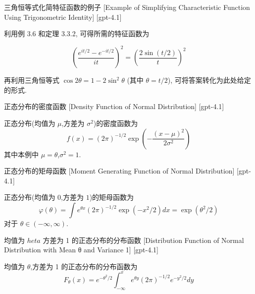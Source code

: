 \documentclass[UTF8]{ctexart}
\begin{document}
    
    
    \begin{xmp}
        {三角恒等式化简特征函数的例子}
        [Example of Simplifying Characteristic Function Using Trigonometric Identity]
        [gpt-4.1]
        
利用例 3.6 和定理 3.3.2, 可得所需的特征函数为

\[
\left( \frac{e^{i t / 2} - e^{-i t / 2}}{i t} \right)^{2} = \left( \frac{2 \sin (t / 2)}{t} \right)^{2}
\]

再利用三角恒等式 $\cos 2 \theta = 1 - 2 \sin^{2} \theta$ (其中 $\theta = t / 2$), 可将答案转化为此处给定的形式.

    \end{xmp}
    
    
    
    \begin{dfn}
        {正态分布的密度函数}
        [Density Function of Normal Distribution]
        [gpt-4.1]
        
正态分布(均值为 $\mu$,方差为 $\sigma^2$)的密度函数为
\[
f(x) = (2\pi)^{-1/2} \exp\left( - \frac{(x-\mu)^2}{2\sigma^2} \right)
\]
其中本例中 $\mu=\theta$,$\sigma^2=1$.

    \end{dfn}
    
    
    
    \begin{dfn}
        {正态分布的矩母函数}
        [Moment Generating Function of Normal Distribution]
        [gpt-4.1]
        
正态分布(均值为 $0$,方差为 $1$)的矩母函数为
\[
\varphi(\theta) = \int e^{\theta x} (2\pi)^{-1/2} \exp(-x^2/2) dx = \exp(\theta^2/2)
\]
对于 $\theta \in (-\infty, \infty)$.

    \end{dfn}
    
    
    
    \begin{dfn}
        {均值为 $	heta$ 方差为 1 的正态分布的分布函数}
        [Distribution Function of Normal Distribution with Mean θ and Variance 1]
        [gpt-4.1]
        
均值为 $\theta$,方差为 1 的正态分布的分布函数为
\[
F_{\theta}(x) = e^{-\theta^2/2} \int_{-\infty}^{x} e^{\theta y} (2\pi)^{-1/2} e^{-y^2/2} dy
\]

    \end{dfn}
    
\end{document}
